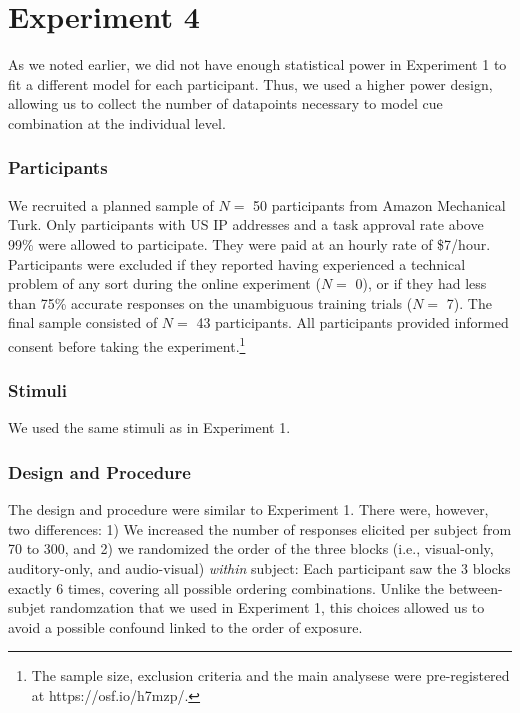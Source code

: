 \documentclass[english,,man,floatsintext]{apa6}
\let\rmarkdownfootnote\footnote%
\def\footnote{\protect\rmarkdownfootnote}
\theoremstyle{definition}
\theoremstyle{definition}
\theoremstyle{definition}
\theoremstyle{remark}
\begin{document}
\section{Experiment 4}\label{experiment-4}

As we noted earlier, we did not have enough statistical power in
Experiment 1 to fit a different model for each participant. Thus, we
used a higher power design, allowing us to collect the number of
datapoints necessary to model cue combination at the individual level.

\subsubsection{Participants}\label{participants-3}

We recruited a planned sample of \(N=\) 50 participants from Amazon
Mechanical Turk. Only participants with US IP addresses and a task
approval rate above 99\% were allowed to participate. They were paid at
an hourly rate of \$7/hour. Participants were excluded if they reported
having experienced a technical problem of any sort during the online
experiment (\(N=\) 0), or if they had less than 75\% accurate responses
on the unambiguous training trials (\(N=\) 7). The final sample
consisted of \(N =\) 43 participants. All participants provided informed
consent before taking the
experiment.\footnote{The sample size, exclusion criteria and the main analysese were pre-registered at https://osf.io/h7mzp/.}

\subsubsection{Stimuli}\label{stimuli-1}

We used the same stimuli as in Experiment 1.

\subsubsection{Design and Procedure}\label{design-and-procedure-1}

The design and procedure were similar to Experiment 1. There were,
however, two differences: 1) We increased the number of responses
elicited per subject from 70 to 300, and 2) we randomized the order of
the three blocks (i.e., visual-only, auditory-only, and audio-visual)
\emph{within} subject: Each participant saw the 3 blocks exactly 6
times, covering all possible ordering combinations. Unlike the
between-subjet randomzation that we used in Experiment 1, this choices
allowed us to avoid a possible confound linked to the order of exposure.
\end{document}
